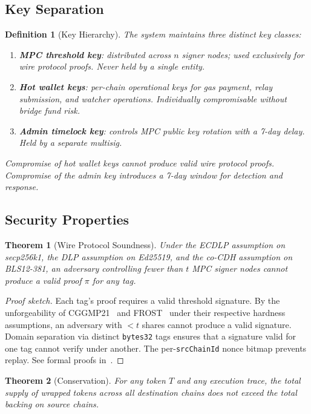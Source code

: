 \documentclass[11pt]{article}
\newtheorem{theorem}{Theorem}
\newtheorem{definition}{Definition}
\begin{document}
\subsection{Key Separation}

\begin{definition}[Key Hierarchy]
The system maintains three distinct key classes:
\begin{enumerate}[nosep]
  \item \textbf{MPC threshold key}: distributed across $n$ signer nodes; used exclusively for wire protocol proofs. Never held by a single entity.
  \item \textbf{Hot wallet keys}: per-chain operational keys for gas payment, relay submission, and watcher operations. Individually compromisable without bridge fund risk.
  \item \textbf{Admin timelock key}: controls MPC public key rotation with a 7-day delay. Held by a separate multisig.
\end{enumerate}
Compromise of hot wallet keys cannot produce valid wire protocol proofs. Compromise of the admin key introduces a 7-day window for detection and response.
\end{definition}

\subsection{Security Properties}

\begin{theorem}[Wire Protocol Soundness]
\label{thm:soundness}
Under the ECDLP assumption on secp256k1, the DLP assumption on Ed25519, and the co-CDH assumption on BLS12-381, an adversary controlling fewer than $t$ MPC signer nodes cannot produce a valid proof $\pi$ for any tag.
\end{theorem}

\begin{proof}[Proof sketch]
Each tag's proof requires a valid threshold signature. By the unforgeability of CGGMP21~\cite{cggmp21} and FROST~\cite{frost} under their respective hardness assumptions, an adversary with $< t$ shares cannot produce a valid signature. Domain separation via distinct \texttt{bytes32} tags ensures that a signature valid for one tag cannot verify under another. The per-\texttt{srcChainId} nonce bitmap prevents replay. See formal proofs in~\cite{luxproof-teleport}.
\end{proof}

\begin{theorem}[Conservation]
\label{thm:conservation}
For any token $T$ and any execution trace, the total supply of wrapped tokens across all destination chains does not exceed the total backing on source chains.
\end{theorem}
\end{document}
